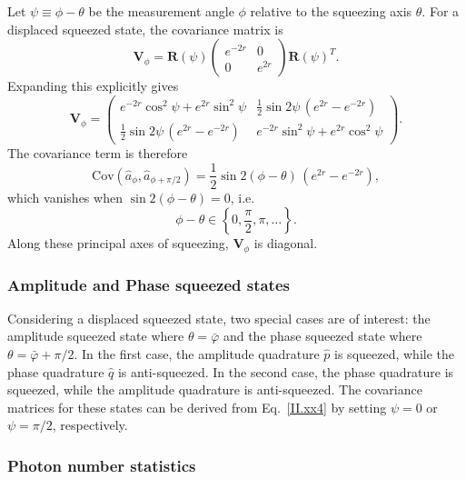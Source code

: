 Let $\psi \equiv \phi - \theta$ be the measurement angle $\phi$ relative to the squeezing axis $\theta$.  
For a displaced squeezed state, the covariance matrix is
\begin{equation}
\mathbf{V}_\phi = \mathbf R(\psi)
\begin{pmatrix}
e^{-2r} & 0 \\[2pt]
0 & e^{2r}
\end{pmatrix}
\mathbf R(\psi)^{T}.
\label{II.xx4}
\end{equation}
Expanding this explicitly gives
\begin{equation}
\mathbf{V}_\phi =
\begin{pmatrix}
e^{-2r} \cos^2\!\psi + e^{2r} \sin^2\!\psi 
& \frac{1}{2} \sin 2\psi \,\left(e^{2r} - e^{-2r}\right) \\[6pt]
\frac{1}{2} \sin 2\psi \,\left(e^{2r} - e^{-2r}\right) 
& e^{-2r} \sin^2\!\psi + e^{2r} \cos^2\!\psi
\end{pmatrix}.
\label{II.xx5}
\end{equation}
The covariance term is therefore
\begin{equation}
\mathrm{Cov}(\hat a_\phi, \hat a_{\phi+\pi/2})
= \frac{1}{2} \sin 2(\phi-\theta)\, \left(e^{2r} - e^{-2r}\right),
\label{II.xx6}
\end{equation}
which vanishes when $\sin 2(\phi-\theta) = 0$, i.e.
\begin{equation*}
\phi - \theta \in \left\{ 0, \frac{\pi}{2}, \pi, \ldots \right\}.
\end{equation*}
Along these principal axes of squeezing, $\mathbf{V}_\phi$ is diagonal. 

\subsubsection{Amplitude and Phase squeezed states}
Considering a displaced squeezed state, two special cases are of interest: the amplitude squeezed state where $\theta=\bar{\varphi}$ and the phase squeezed state where $\theta = \bar{\varphi}+\pi/2$. In the first case, the amplitude quadrature $\hat{p}$ is squeezed, while the phase quadrature $\hat{q}$ is anti-squeezed. In the second case, the phase quadrature is squeezed, while the amplitude quadrature is anti-squeezed. The covariance matrices for these states can be derived from Eq.~\eqref{II.xx4} by setting $\psi = 0$ or $\psi = \pi/2$, respectively.
\subsubsection*{Photon number statistics}

